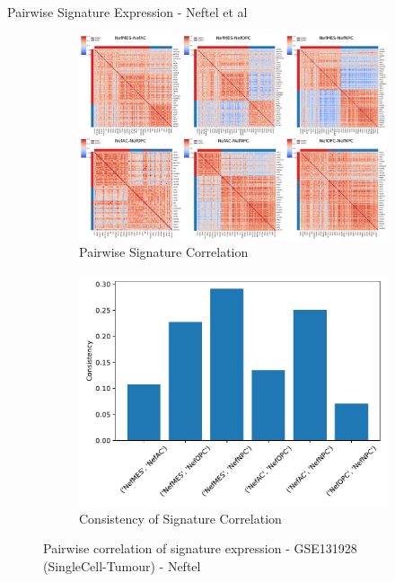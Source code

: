 \documentclass[aspectratio=169,9pt]{beamer}
\begin{document}
    \begin{frame}{Pairwise Signature Expression - Neftel et al}
        \begin{adjustwidth}{-5cm}{-5cm}
            \centering
            \begin{figure}
                \centering
                \begin{subfigure}[c]{0.7\textwidth}
                    \centering
                    \includegraphics[width=\textwidth]{GSM3828672_Corrplot_pair-Nef}
                    \caption{Pairwise Signature Correlation}
                \end{subfigure}
                \begin{subfigure}[c]{0.4\textwidth}
                    \centering
                    \includegraphics[width=\textwidth]{GSM3828672_Consistency_Nef}
                    \caption{Consistency of Signature Correlation}
                \end{subfigure}
                \caption{Pairwise correlation of signature expression - GSE131928 (SingleCell-Tumour) - Neftel}
            \end{figure}
        \end{adjustwidth}
    \end{frame}
\end{document}
